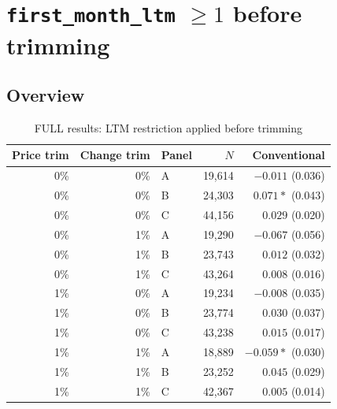 \section{\texttt{first\_month\_ltm} $\geq 1$ before trimming}
\subsection{Overview}
\begin{table}[!htbp]
\centering
\caption{FULL results: LTM restriction applied before trimming}
\label{tab:ltm1:panels_abc_trim_grid_full}
\small
\begin{tabular}{rrlrr}
\toprule
Price trim & Change trim & Panel & $N$ & Conventional \\
\midrule
0\% & 0\% & A & 19,614 & $-0.011$ (0.036) \\
0\% & 0\% & B & 24,303 & $0.071*$ (0.043) \\
0\% & 0\% & C & 44,156 & $0.029$ (0.020) \\
0\% & 1\% & A & 19,290 & $-0.067$ (0.056) \\
0\% & 1\% & B & 23,743 & $0.012$ (0.032) \\
0\% & 1\% & C & 43,264 & $0.008$ (0.016) \\
1\% & 0\% & A & 19,234 & $-0.008$ (0.035) \\
1\% & 0\% & B & 23,774 & $0.030$ (0.037) \\
1\% & 0\% & C & 43,238 & $0.015$ (0.017) \\
1\% & 1\% & A & 18,889 & $-0.059*$ (0.030) \\
1\% & 1\% & B & 23,252 & $0.045$ (0.029) \\
1\% & 1\% & C & 42,367 & $0.005$ (0.014) \\
\bottomrule
\end{tabular}
\end{table}

